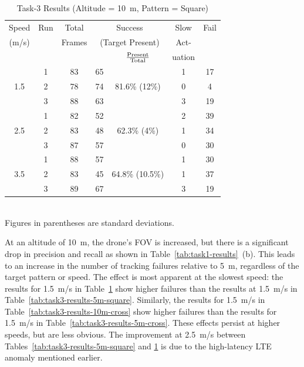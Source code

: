 \begin{table}
	\centering\small
	\begin{tabular}{|c|c|c|c|c|c|c|}
		\hline
		Speed & Run & Total & \multicolumn{2}{c|}{Success} & Slow & Fail\\
		(m/s) &  & Frames  & \multicolumn{2}{c|}{\footnotesize (Target Present)}& Act-  &  \\
		\cline{5-5} 
		&  &         &         & $\rm \frac{Present}{Total}$ & uation  & \\ 
		\hline
		& 1 & 83 & 65 & & 1 & 17 \\
		1.5 & 2 & 78 & 74 & 81.6\% \scriptsize{(12\%)}  & 0 & 4 \\
		& 3 & 88 & 63 & & 3 & 19\\
		\hline
		& 1 & 82 & 52 & & 2 & 39 \\
		2.5 & 2 & 83 & 48 & 62.3\% \scriptsize{(4\%)} & 1 & 34 \\
		& 3 & 87 & 57 & & 0 & 30 \\
		\hline
		& 1 & 88 & 57 & & 1 & 30 \\
		3.5 & 2 & 83 & 45 & 64.8\% \scriptsize{(10.5\%)} & 1 & 37  \\
		& 3 & 89 & 67 & & 3 & 19 \\
		\hline
	\end{tabular}
	\begin{captext}
		\centering \\[0.1cm] Figures in parentheses are standard deviations. \\
	\end{captext}
	\caption{Task-3 Results {\footnotesize (Altitude = 10~m, Pattern = Square)}}
	\label{tab:task3-results-10m-square}
\end{table}


At an altitude of 10~m, the drone's FOV is increased, but there is a
significant drop in precision and recall as shown in
Table~\ref{tab:task1-results}~(b).  This leads to an increase in the
number of tracking failures relative to 5~m, regardless of the target
pattern or speed.  The effect is most apparent at the slowest speed:
the results for 1.5~m/s in Table~\ref{tab:task3-results-10m-square}
show higher failures than the results at 1.5~m/s in
Table~\ref{tab:task3-results-5m-square}.  Similarly, the results for
1.5~m/s in Table~\ref{tab:task3-results-10m-cross} show higher
failures than the results for 1.5~m/s in
Table~\ref{tab:task3-results-5m-cross}. These effects persist at
higher speeds, but are less obvious.  The improvement at
2.5~m/s between Tables~\ref{tab:task3-results-5m-square} and
\ref{tab:task3-results-10m-square} is due to the high-latency LTE
anomaly mentioned earlier.

